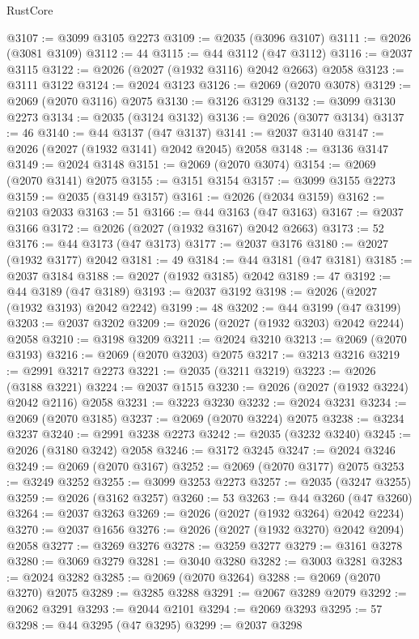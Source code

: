 \begin{lexlean}{RustCore}
\begin{coremodule}
@3107 := @3099 @3105 @2273
@3109 := @2035 (@3096 @3107)
@3111 := @2026 (@3081 @3109)
@3112 := 44
@3115 := @44 @3112 (@47 @3112)
@3116 := @2037 @3115
@3122 := @2026 (@2027 (@1932 @3116) @2042 @2663) @2058
@3123 := @3111 @3122
@3124 := @2024 @3123
@3126 := @2069 (@2070 @3078)
@3129 := @2069 (@2070 @3116) @2075
@3130 := @3126 @3129
@3132 := @3099 @3130 @2273
@3134 := @2035 (@3124 @3132)
@3136 := @2026 (@3077 @3134)
@3137 := 46
@3140 := @44 @3137 (@47 @3137)
@3141 := @2037 @3140
@3147 := @2026 (@2027 (@1932 @3141) @2042 @2045) @2058
@3148 := @3136 @3147
@3149 := @2024 @3148
@3151 := @2069 (@2070 @3074)
@3154 := @2069 (@2070 @3141) @2075
@3155 := @3151 @3154
@3157 := @3099 @3155 @2273
@3159 := @2035 (@3149 @3157)
@3161 := @2026 (@2034 @3159)
@3162 := @2103 @2033
@3163 := 51
@3166 := @44 @3163 (@47 @3163)
@3167 := @2037 @3166
@3172 := @2026 (@2027 (@1932 @3167) @2042 @2663)
@3173 := 52
@3176 := @44 @3173 (@47 @3173)
@3177 := @2037 @3176
@3180 := @2027 (@1932 @3177) @2042
@3181 := 49
@3184 := @44 @3181 (@47 @3181)
@3185 := @2037 @3184
@3188 := @2027 (@1932 @3185) @2042
@3189 := 47
@3192 := @44 @3189 (@47 @3189)
@3193 := @2037 @3192
@3198 := @2026 (@2027 (@1932 @3193) @2042 @2242)
@3199 := 48
@3202 := @44 @3199 (@47 @3199)
@3203 := @2037 @3202
@3209 := @2026 (@2027 (@1932 @3203) @2042 @2244) @2058
@3210 := @3198 @3209
@3211 := @2024 @3210
@3213 := @2069 (@2070 @3193)
@3216 := @2069 (@2070 @3203) @2075
@3217 := @3213 @3216
@3219 := @2991 @3217 @2273
@3221 := @2035 (@3211 @3219)
@3223 := @2026 (@3188 @3221)
@3224 := @2037 @1515
@3230 := @2026 (@2027 (@1932 @3224) @2042 @2116) @2058
@3231 := @3223 @3230
@3232 := @2024 @3231
@3234 := @2069 (@2070 @3185)
@3237 := @2069 (@2070 @3224) @2075
@3238 := @3234 @3237
@3240 := @2991 @3238 @2273
@3242 := @2035 (@3232 @3240)
@3245 := @2026 (@3180 @3242) @2058
@3246 := @3172 @3245
@3247 := @2024 @3246
@3249 := @2069 (@2070 @3167)
@3252 := @2069 (@2070 @3177) @2075
@3253 := @3249 @3252
@3255 := @3099 @3253 @2273
@3257 := @2035 (@3247 @3255)
@3259 := @2026 (@3162 @3257)
@3260 := 53
@3263 := @44 @3260 (@47 @3260)
@3264 := @2037 @3263
@3269 := @2026 (@2027 (@1932 @3264) @2042 @2234)
@3270 := @2037 @1656
@3276 := @2026 (@2027 (@1932 @3270) @2042 @2094) @2058
@3277 := @3269 @3276
@3278 := @3259 @3277
@3279 := @3161 @3278
@3280 := @3069 @3279
@3281 := @3040 @3280
@3282 := @3003 @3281
@3283 := @2024 @3282
@3285 := @2069 (@2070 @3264)
@3288 := @2069 (@2070 @3270) @2075
@3289 := @3285 @3288
@3291 := @2067 @3289 @2079
@3292 := @2062 @3291
@3293 := @2044 @2101
@3294 := @2069 @3293
@3295 := 57
@3298 := @44 @3295 (@47 @3295)
@3299 := @2037 @3298

\end{coremodule}
\end{lexlean}
